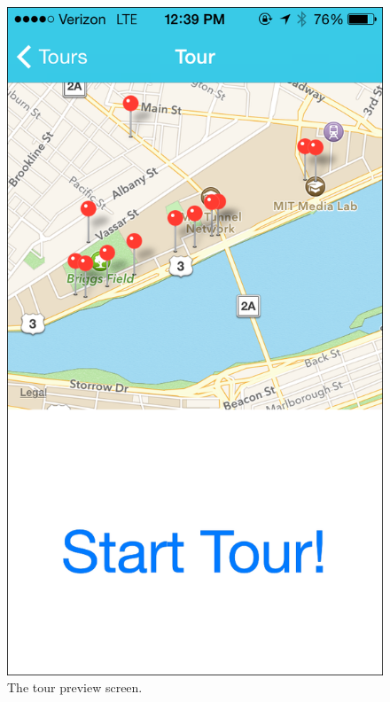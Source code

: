 \documentclass{sigchi}
\begin{document}
\begin{figure}
\centering
\includegraphics[width=1.0\linewidth]{./TourPreview}
\caption{The tour preview screen.}
\label{fig:TourPreview}
\end{figure}
\end{document}
